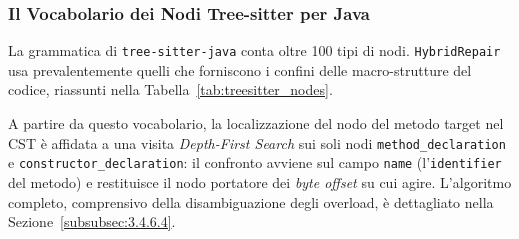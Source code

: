 \subsubsection{Il Vocabolario dei Nodi Tree-sitter per Java}
\label{subsubsec:3.4.5.4}
La grammatica di \texttt{tree-sitter-java} conta oltre 100 tipi di nodi. \texttt{HybridRepair} usa prevalentemente
quelli che forniscono i confini delle macro-strutture del codice, riassunti nella Tabella~\ref{tab:treesitter_nodes}.

\begin{table}[H]
\centering
\caption{Principali tipi di nodo della grammatica \texttt{tree-sitter-java} usati da \texttt{HybridRepair}.}
\label{tab:treesitter_nodes}
\end{table}

A partire da questo vocabolario, la localizzazione del nodo del metodo target nel CST è affidata a una visita
\textit{Depth-First Search} sui soli nodi \texttt{method\_declaration} e \texttt{constructor\_declaration}: il
confronto avviene sul campo \texttt{name} (l'\texttt{identifier} del metodo) e restituisce il nodo portatore dei
\textit{byte offset} su cui agire. L'algoritmo completo, comprensivo della disambiguazione degli overload, è
dettagliato nella Sezione~\ref{subsubsec:3.4.6.4}.

